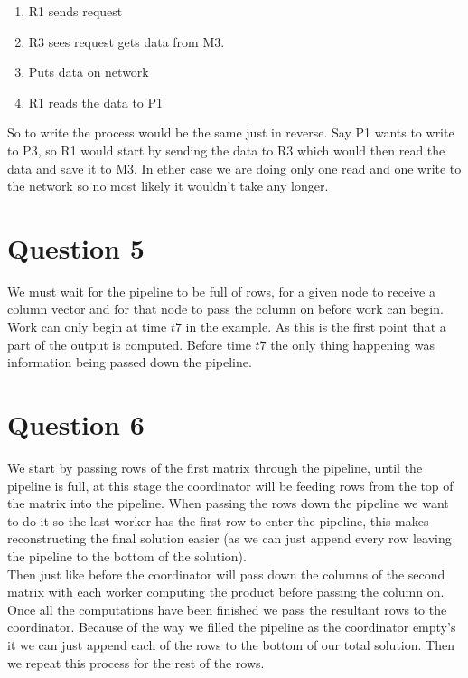 \documentclass[a4paper, 12pt]{article}
\begin{document}
  		\begin{enumerate}
  			\item R1 sends request
  			\item R3 sees request gets data from M3.
  			\item Puts data on network
  			\item R1 reads the data to P1 
  		\end{enumerate}
  	
		So to write the process would be the same just in reverse. Say P1 wants to write to P3, so R1 would start by sending the data to R3 which would then read the data and save it to M3. In ether case we are doing only one read and one write to the network so no most likely it wouldn't take any longer.
  	
  	\section{Question 5}
		We must wait for the pipeline to be full of rows, for a given node to receive a column vector and for that node to pass the column on before work can begin. Work can only begin at time $t7$ in the example. As this is the first point that a part of the output is computed. Before time $t7$ the only thing happening was information being passed down the pipeline.
  	
  	\section{Question 6}
		We start by passing rows of the first matrix through the pipeline, until the pipeline is full, at this stage the coordinator will be feeding rows from the top of the matrix into the pipeline. When passing the rows down the pipeline we want to do it so the last worker has the first row to enter the pipeline, this makes reconstructing the final solution easier (as we can just append every row leaving the pipeline to the bottom of the solution).\\
		
		Then just like before the coordinator will pass down the columns of the second matrix with each worker computing the product before passing the column on. Once all the computations have been finished we pass the resultant rows to the coordinator. Because of the way we filled the pipeline as the coordinator empty's it we can just append each of the rows to the bottom of our total solution. Then we repeat this process for the rest of the rows.\\
  	
\end{document}

